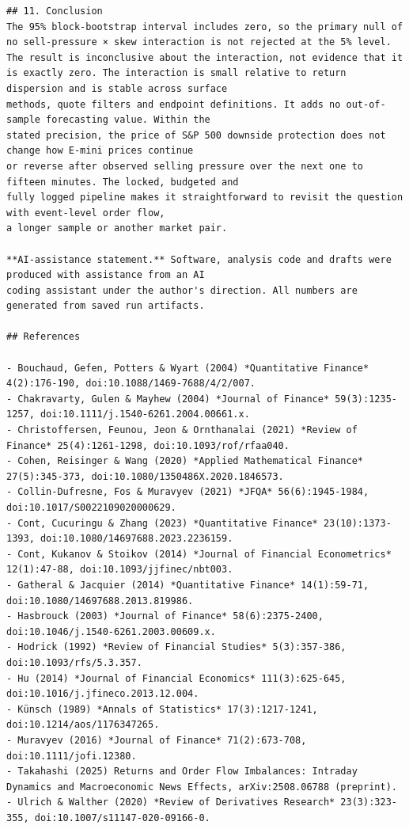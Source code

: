 \documentclass[11pt]{article}
\begin{document}
\begin{verbatim}
## 11. Conclusion
The 95% block-bootstrap interval includes zero, so the primary null of no sell-pressure × skew interaction is not rejected at the 5% level. The result is inconclusive about the interaction, not evidence that it is exactly zero. The interaction is small relative to return dispersion and is stable across surface
methods, quote filters and endpoint definitions. It adds no out-of-sample forecasting value. Within the
stated precision, the price of S&P 500 downside protection does not change how E-mini prices continue
or reverse after observed selling pressure over the next one to fifteen minutes. The locked, budgeted and
fully logged pipeline makes it straightforward to revisit the question with event-level order flow,
a longer sample or another market pair.

**AI-assistance statement.** Software, analysis code and drafts were produced with assistance from an AI
coding assistant under the author's direction. All numbers are generated from saved run artifacts.

## References

- Bouchaud, Gefen, Potters & Wyart (2004) *Quantitative Finance* 4(2):176-190, doi:10.1088/1469-7688/4/2/007.
- Chakravarty, Gulen & Mayhew (2004) *Journal of Finance* 59(3):1235-1257, doi:10.1111/j.1540-6261.2004.00661.x.
- Christoffersen, Feunou, Jeon & Ornthanalai (2021) *Review of Finance* 25(4):1261-1298, doi:10.1093/rof/rfaa040.
- Cohen, Reisinger & Wang (2020) *Applied Mathematical Finance* 27(5):345-373, doi:10.1080/1350486X.2020.1846573.
- Collin-Dufresne, Fos & Muravyev (2021) *JFQA* 56(6):1945-1984, doi:10.1017/S0022109020000629.
- Cont, Cucuringu & Zhang (2023) *Quantitative Finance* 23(10):1373-1393, doi:10.1080/14697688.2023.2236159.
- Cont, Kukanov & Stoikov (2014) *Journal of Financial Econometrics* 12(1):47-88, doi:10.1093/jjfinec/nbt003.
- Gatheral & Jacquier (2014) *Quantitative Finance* 14(1):59-71, doi:10.1080/14697688.2013.819986.
- Hasbrouck (2003) *Journal of Finance* 58(6):2375-2400, doi:10.1046/j.1540-6261.2003.00609.x.
- Hodrick (1992) *Review of Financial Studies* 5(3):357-386, doi:10.1093/rfs/5.3.357.
- Hu (2014) *Journal of Financial Economics* 111(3):625-645, doi:10.1016/j.jfineco.2013.12.004.
- Künsch (1989) *Annals of Statistics* 17(3):1217-1241, doi:10.1214/aos/1176347265.
- Muravyev (2016) *Journal of Finance* 71(2):673-708, doi:10.1111/jofi.12380.
- Takahashi (2025) Returns and Order Flow Imbalances: Intraday Dynamics and Macroeconomic News Effects, arXiv:2508.06788 (preprint).
- Ulrich & Walther (2020) *Review of Derivatives Research* 23(3):323-355, doi:10.1007/s11147-020-09166-0.



\end{verbatim}
\end{document}
